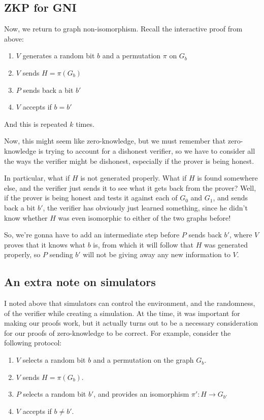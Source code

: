 \documentclass[11pt]{article}
\begin{document}
\subsection{ZKP for GNI}

Now, we return to graph non-isomorphism. Recall the interactive proof from above:
\begin{enumerate}
\item \(V\) generates a random bit \(b\) and a permutation \(\pi\) on \(G_b\)
\item \(V\) sends \(H=\pi(G_b)\)
\item \(P\) sends back a bit \(b'\)
\item \(V\) accepts if \(b=b'\)
\end{enumerate}
And this is repeated \(k\) times. \bigskip

Now, this might seem like zero-knowledge, but we must remember that zero-knowledge is trying to account for a dishonest verifier, so we have to consider all the ways the verifier might be dishonest, especially if the prover is being honest.\medskip

In particular, what if \(H\) is not generated properly. What if \(H\) is found somewhere else, and the verifier just sends it to see what it gets back from the prover? Well, if the prover is being honest and tests it against each of \(G_0\) and \(G_1\), and sends back a bit \(b'\), the verifier has obviously just learned something, since he didn't know whether \(H\) was even isomorphic to either of the two graphs before!\medskip

So, we're gonna have to add an intermediate step before \(P\) sends back \(b'\), where \(V\) proves that it knows what \(b\) is, from which it will follow that \(H\) was generated properly, so \(P\) sending \(b'\) will not be giving away any new information to \(V\).

\newpage
\subsection{An extra note on simulators}

I noted above that simulators can control the environment, and the randomness, of the verifier while creating a simulation. At the time, it was important for making our proofs work, but it actually turns out to be a necessary consideration for our proofs of zero-knowledge to be correct. For example, consider the following protocol:

\begin{enumerate}
\item \(V\) selects a random bit \(b\) and a permutation on the graph \(G_b\).
\item \(V\) sends \(H=\pi(G_b)\).
\item \(P\) selects a random bit \(b'\), and provides an isomorphism \(\pi': H\to G_{b'}\)
\item \(V\) accepts if \(b\ne b'\).
\end{enumerate}
\end{document}
